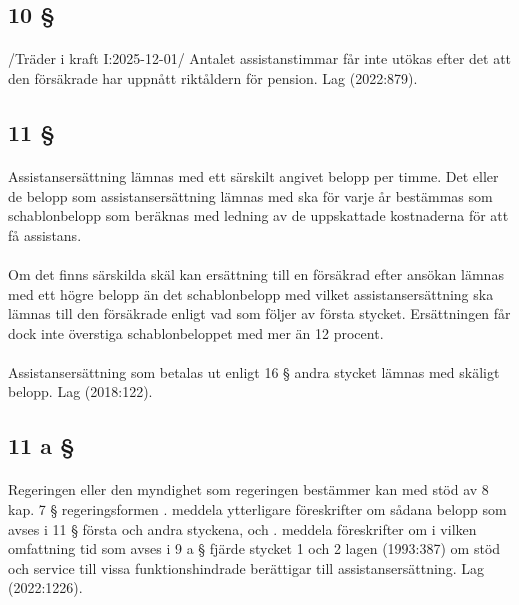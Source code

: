 \documentclass[a4paper,notitlepage,openany,10pt]{book}
\begin{document}
\subsection*{10 §}
\paragraph*{}
/Träder i kraft I:2025-12-01/
Antalet assistanstimmar får inte utökas efter det att den försäkrade har uppnått riktåldern för pension.
Lag (2022:879).
\subsection*{11 §}
\paragraph*{}
Assistansersättning lämnas med ett särskilt angivet belopp per timme. Det eller de belopp som assistansersättning lämnas med ska för varje år bestämmas som schablonbelopp som beräknas med ledning av de uppskattade kostnaderna för att få assistans.
\paragraph*{}
Om det finns särskilda skäl kan ersättning till en försäkrad efter ansökan lämnas med ett högre belopp än det schablonbelopp med vilket assistansersättning ska lämnas till den försäkrade enligt vad som följer av första stycket. Ersättningen får dock inte överstiga schablonbeloppet med mer än 12 procent.
\paragraph*{}
Assistansersättning som betalas ut enligt 16 § andra stycket lämnas med skäligt belopp.
Lag (2018:122).
\subsection*{11 a §}
\paragraph*{}
Regeringen eller den myndighet som regeringen bestämmer kan med stöd av 8 kap. 7 § regeringsformen
. meddela ytterligare föreskrifter om sådana belopp som avses i 11 § första och andra styckena, och
. meddela föreskrifter om i vilken omfattning tid som avses i 9 a § fjärde stycket 1 och 2 lagen (1993:387) om stöd och service till vissa funktionshindrade berättigar till assistansersättning.
Lag (2022:1226).
\end{document}
